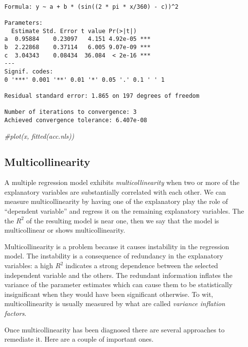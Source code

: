 \documentclass[]{book}
\newenvironment{Shaded}{\begin{snugshade}}{\end{snugshade}}
\newcommand{\CommentTok}[1]{\textcolor[rgb]{0.56,0.35,0.01}{\textit{{#1}}}}
\numberwithin{equation}{chapter}
\numberwithin{figure}{chapter}
\theoremstyle{plain}
\theoremstyle{definition}
\theoremstyle{remark}
\theoremstyle{definition}
\theoremstyle{definition}
\theoremstyle{remark}
\begin{document}
\begin{verbatim}

Formula: y ~ a + b * (sin((2 * pi * x/360) - c))^2

Parameters:
  Estimate Std. Error t value Pr(>|t|)    
a  0.95884    0.23097   4.151 4.92e-05 ***
b  2.22868    0.37114   6.005 9.07e-09 ***
c  3.04343    0.08434  36.084  < 2e-16 ***
---
Signif. codes:  
0 '***' 0.001 '**' 0.01 '*' 0.05 '.' 0.1 ' ' 1

Residual standard error: 1.865 on 197 degrees of freedom

Number of iterations to convergence: 3 
Achieved convergence tolerance: 6.407e-08
\end{verbatim}

\begin{Shaded}
\begin{Highlighting}[]
\CommentTok{#plot(x, fitted(acc.nls))}
\end{Highlighting}
\end{Shaded}

\subsection{Multicollinearity}\label{sub-multicollinearity}

A multiple regression model exhibits \emph{multicollinearity} when two
or more of the explanatory variables are substantially correlated with
each other. We can measure multicollinearity by having one of the
explanatory play the role of ``dependent variable'' and regress it on
the remaining explanatory variables. The the \(R^{2}\) of the resulting
model is near one, then we say that the model is multicollinear or shows
multicollinearity.

Multicollinearity is a problem because it causes instability in the
regression model. The instability is a consequence of redundancy in the
explanatory variables: a high \(R^{2}\) indicates a strong dependence
between the selected independent variable and the others. The redundant
information inflates the variance of the parameter estimates which can
cause them to be statistically insignificant when they would have been
significant otherwise. To wit, multicollinearity is usually measured by
what are called \emph{variance inflation factors}.

Once multicollinearity has been diagnosed there are several approaches
to remediate it. Here are a couple of important ones.
\end{document}
